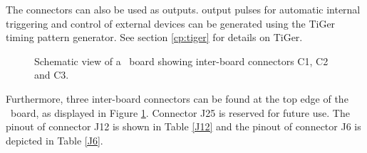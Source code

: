 	
	The connectors can also be used as outputs. 
	 output pulses for automatic internal triggering and control of external devices 
	can be generated using the TiGer timing pattern generator. See section \ref{cp:tiger} for details on TiGer. 

		\begin{figure}[ht]
			\begin{center}
				
				\caption{Schematic view of a \deviceName\ board showing inter-board connectors C1, C2 and C3.\label{fig:schematics}}
			\end{center} 
		\end{figure}

	Furthermore, three inter-board connectors can be found at the top edge of the \deviceName\ board, 
	as displayed in Figure \ref{fig:schematics}. 
	Connector J25 is reserved for future use. The pinout of connector J12 is shown in Table \ref{J12} and the pinout of connector J6 is depicted in Table \ref{J6}.


